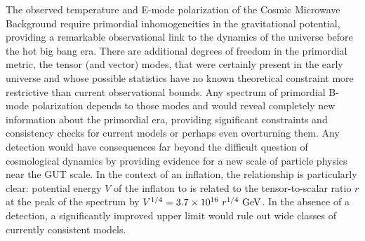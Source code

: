 The observed temperature and E-mode polarization of the Cosmic Microwave Background require primordial inhomogeneities in the gravitational potential, providing a remarkable observational link to the dynamics of the universe before the hot big bang era. There are additional degrees of freedom in the primordial metric, the tensor (and vector) modes, that were certainly present in the early universe and whose possible statistics have no known theoretical constraint more restrictive than current observational bounds. Any spectrum of primordial B-mode polarization depends to those modes and would reveal completely new information about the primordial era, providing significant constraints and consistency checks for current models or perhaps even overturning them. Any detection would have consequences far beyond the difficult question of cosmological dynamics by providing evidence for a new scale of particle physics near the GUT scale. In the context of an inflation, the relationship is particularly clear: potential energy $V$ of the inflaton to is related to the tensor-to-scalar ratio $r$ at the peak of the spectrum by $V^{1/4} = 3.7 \times 10^{16} \ r^{1/4}\,\, {\rm GeV}$. In the absence of a detection, a significantly improved upper limit would rule out wide classes of currently consistent models. 

